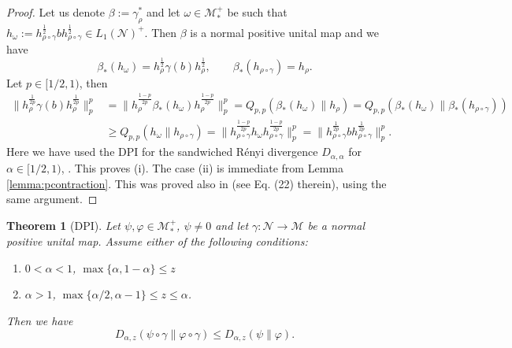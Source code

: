 \documentclass[12pt]{article}
\newtheorem{theorem}{Theorem}[section]
\theoremstyle{definition}
\theoremstyle{remark}
\numberwithin{equation}{section}
\def\Me{\mathcal M}
\def\Ne{\mathcal N}
\begin{document}
\begin{proof} Let us denote $\beta:=\gamma_\rho^*$ and let $\omega\in \Me_*^+$ be such
that 
$h_\omega:=h_{\rho\circ\gamma}^{\frac12}bh_{\rho\circ\gamma}^{\frac12}\in L_1(\Ne)^+$. Then
$\beta$ is a normal positive unital map and  we have 
\[
\beta_*(h_\omega)=h_\rho^{\frac12}\gamma(b)h_\rho^{\frac12},\qquad
\beta_*(h_{\rho\circ\gamma})=h_\rho.
\]
Let $p\in [1/2,1)$, then  
\begin{align*}
\|h_{\rho}^{\frac{1}{2p}}\gamma(b)h_{\rho}^{\frac{1}{2p}}\|^p_p&=
\|h_\rho^{\frac{1-p}{2p}}\beta_*(h_\omega)h_\rho^{\frac{1-p}{2p}}\|_p^p=
Q_{p,p}(\beta_*(h_\omega)\|h_\rho)=Q_{p,p}(\beta_*(h_\omega)\|\beta_*(h_{\rho\circ\gamma}))\\
&\ge  Q_{p,p}(h_\omega\|h_{\rho\circ\gamma})=\|h_{\rho\circ\gamma}^{\frac{1-p}{2p}}h_\omega
h_{\rho\circ\gamma}^{\frac{1-p}{2p}}\|_p^p=\|h_{\rho\circ\gamma}^{\frac{1}{2p}}bh_{\rho\circ\gamma}^{\frac{1}{2p}}\|^p_p.
\end{align*}
Here we have used the DPI for the sandwiched R\'enyi  divergence $D_{\alpha,\alpha}$ for
$\alpha\in [1/2,1)$, \cite[Theorem 4.1]{jencova2021renyi}.  This proves (i). 
The case (ii) is immediate from Lemma \ref{lemma:pcontraction}. This was proved also 
in \cite{kato2023onrenyi} (see Eq. (22) therein), using the same argument.


\end{proof}




\begin{theorem}[DPI] \label{thm:dpi} Let $\psi,\varphi\in \Me_*^+$, $\psi\ne 0$ and let $\gamma:
\Ne\to \Me$ be a normal positive unital map. Assume either of the following conditions:
\begin{enumerate}
\item[(i)] $0<\alpha<1$, $\max\{\alpha,1-\alpha\}\le z$
\item[(ii)] $\alpha>1$, $\max\{\alpha/2,\alpha-1\}\le z\le \alpha$.
\end{enumerate}
Then we have
\[
D_{\alpha,z}(\psi\circ\gamma\|\varphi\circ\gamma)\le D_{\alpha,z}(\psi\|\varphi).
\]


\end{theorem}
\end{document}
